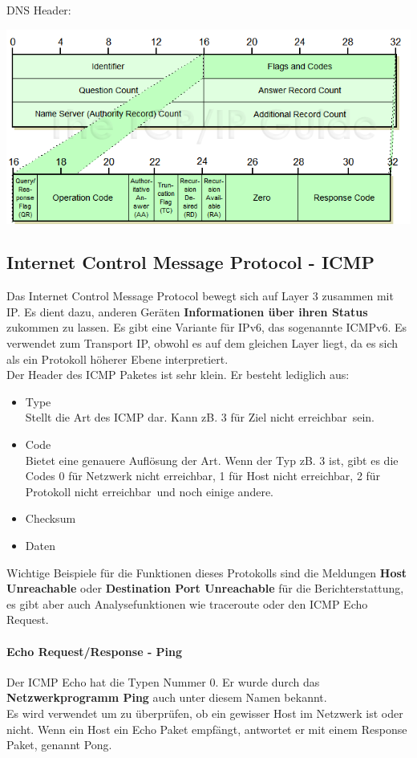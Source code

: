 \documentclass[12pt,a4paper]{report}
\begin{document}
\begin{onehalfspace}
DNS Header:\\
\begin{center}
\includegraphics[scale=0.7]{../docs/tarkes/pics/dnsheader.png}
\end{center}
\subsection{Internet Control Message Protocol - ICMP}
Das Internet Control Message Protocol bewegt sich auf Layer 3 zusammen mit IP. Es dient dazu, anderen Geräten \textbf{Informationen über ihren Status} zukommen zu lassen. Es gibt eine Variante für IPv6, das sogenannte ICMPv6. Es verwendet zum Transport IP, obwohl es auf dem gleichen Layer liegt, da es sich als ein Protokoll höherer Ebene interpretiert.\\

Der Header des ICMP Paketes ist sehr klein. Er besteht lediglich aus:
\begin{itemize}
\item Type\\
Stellt die Art des ICMP dar. Kann zB. 3 für \glqq Ziel nicht erreichbar\grqq \ sein.
\item Code\\
Bietet eine genauere Auflösung der Art. Wenn der Typ zB. 3 ist, gibt es die Codes 0 für \glqq Netzwerk nicht erreichbar\grqq , 1 für \glqq Host nicht erreichbar\grqq , 2 für \glqq Protokoll nicht erreichbar\grqq \ und noch einige andere.
\item Checksum
\item Daten
\end{itemize}

Wichtige Beispiele für die Funktionen dieses Protokolls sind die Meldungen \textbf{Host Unreachable} oder \textbf{Destination Port Unreachable} für die Berichterstattung, es gibt aber auch Analysefunktionen wie traceroute oder den ICMP Echo Request. 
\paragraph{Echo Request/Response - Ping}
Der ICMP Echo hat die Typen Nummer 0. Er wurde durch das \textbf{Netzwerkprogramm Ping} auch unter diesem Namen bekannt.\\
Es wird verwendet um zu überprüfen, ob ein gewisser Host im Netzwerk ist oder nicht. Wenn ein Host ein Echo Paket empfängt, antwortet er mit einem Response Paket, genannt Pong.\\


\end{onehalfspace}
\end{document}
